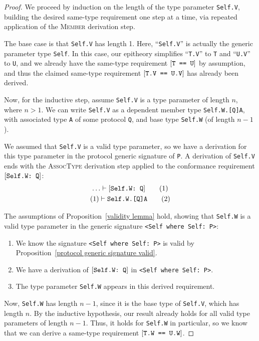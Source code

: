 \documentclass[../generics]{subfiles}
\begin{document}
\begin{proof}
We proceed by induction on the length of the type parameter \texttt{Self.V}, building the desired same-type requirement one step at a time, via repeated application of the \textsc{Member} derivation step.

The base case is that \texttt{Self.V} has length 1. Here, ``\texttt{Self.V}'' is actually the generic parameter type \texttt{Self}. In this case, our epitheory simplifies ``\texttt{T.V}'' to \texttt{T} and ``\texttt{U.V}'' to \texttt{U}, and we already have the same-type requirement $[\texttt{T == U}]$ by assumption, and thus the claimed same-type requirement $[\texttt{T.V == U.V}]$ has already been derived.

Now, for the inductive step, assume \texttt{Self.V} is a type parameter of length $n$, where $n>1$. We can write \texttt{Self.V} as a dependent member type \texttt{Self.W.[Q]A}, with associated type \texttt{A} of some protocol \texttt{Q}, and base type \texttt{Self.W} (of length $n-1$).

We assumed that \texttt{Self.V} is a valid type parameter, so we have a derivation for this type parameter in the protocol generic signature of \texttt{P}. A derivation of \texttt{Self.V} ends with the \textsc{AssocType} derivation step applied to the conformance requirement $[\texttt{Self.W:~Q}]$:
\begin{gather*}
\ldots\vdash [\texttt{Self.W:~Q}]\tag{1}\\
(1)\vdash \texttt{Self.W.[Q]A}\tag{2}
\end{gather*}

The assumptions of Proposition~\ref{validity lemma} hold, showing that \texttt{Self.W} is a valid type parameter in the generic signature \verb|<Self where Self: P>|:
\begin{enumerate}
\item We know the signature \verb|<Self where Self: P>| is valid by Proposition~\ref{protocol generic signature valid}.
\item We have a derivation of $[\texttt{Self.W:~Q}]$ in \verb|<Self where Self: P>|.
\item The type parameter \texttt{Self.W} appears in this derived requirement.
\end{enumerate}
Now, \texttt{Self.W} has length $n-1$, since it is the base type of \texttt{Self.V}, which has length $n$. By the inductive hypothesis, our result already holds for all valid type parameters of length $n-1$. Thus, it holds for \texttt{Self.W} in particular, so we know that we can derive a same-type requirement $[\texttt{T.W == U.W}]$.


\end{proof}
\end{document}
